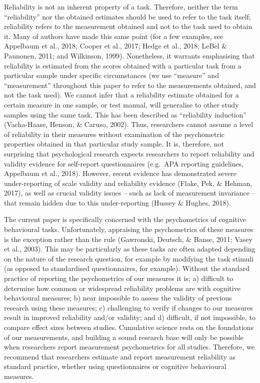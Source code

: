 \documentclass[english,,man,floatsintext]{apa6}
\begin{document}
Reliability is not an inherent property of a task. Therefore, neither the term \enquote{reliability} nor the obtained estimates should be used to refer to the task itself; reliability refers to the measurement obtained and not to the task used to obtain it. Many of authors have made this same point (for a few examples, see Appelbaum et al., 2018; Cooper et al., 2017; Hedge et al., 2018; LeBel \& Paunonen, 2011; and Wilkinson, 1999). Nonetheless, it warrants emphasising that reliability is estimated from the scores obtained with a particular task from a particular sample under specific circumstances (we use \enquote{measure} and \enquote{measurement} throughout this paper to refer to the measurements obtained, and not the task used). We cannot infer that a reliability estimate obtained for a certain measure in one sample, or test manual, will generalise to other study samples using the same task. This has been described as \enquote{reliability induction} (Vacha-Haase, Henson, \& Caruso, 2002). Thus, researchers cannot assume a level of reliability in their measures without examination of the psychometric properties obtained in that particular study sample. It is, therefore, not surprising that psychological research expects researchers to report reliability and validity evidence for self-report questionnaires (e.g.~APA reporting guidelines, Appelbaum et al., 2018). However, recent evidence has demonstrated severe under-reporting of scale validity and reliability evidence (Flake, Pek, \& Hehman, 2017), as well as crucial validity issues -- such as lack of measurement invariance -- that remain hidden due to this under-reporting (Hussey \& Hughes, 2018).

The current paper is specifically concerned with the psychometrics of cognitive behavioural tasks. Unfortunately, appraising the psychometrics of these measures is the exception rather than the rule (Gawronski, Deutsch, \& Banse, 2011; Vasey et al., 2003). This may be particularly as these tasks are often adapted depending on the nature of the research question, for example by modifying the task stimuli (as opposed to standardised questionnaires, for example). Without the standard practice of reporting the psychometrics of our measures it is; a) difficult to determine how common or widespread reliability problems are with cognitive behavioural measures; b) near impossible to assess the validity of previous research using these measures; c) challenging to verify if changes to our measures result in improved reliability and/or validity; and d) difficult, if not impossible, to compare effect sizes between studies. Cumulative science rests on the foundations of our measurements, and building a sound research base will only be possible when researchers report measurement psychometrics for all studies. Therefore, we recommend that researchers estimate and report measurement reliability as standard practice, whether using questionnaires or cognitive behavioural measures.
\end{document}
